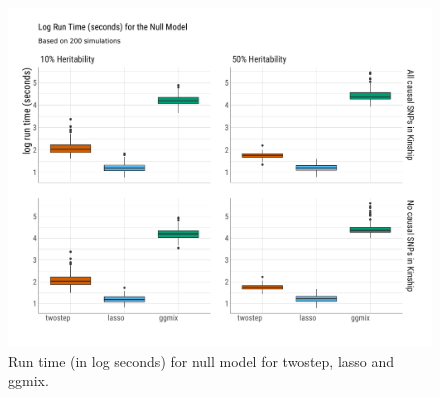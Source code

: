 \documentclass[12pt,letter]{article}\usepackage[]{graphicx}\usepackage[]{color}
\newenvironment{knitrout}{}{} %
\begin{document}
\begin{knitrout}\scriptsize
{}\color{fgcolor}\begin{figure}[H]

{\centering \includegraphics[width=1\linewidth]{figure/plot-runtime-sim-null-model-1} 

}

\caption[Run time (in log seconds) for null model for twostep, lasso and ggmix]{Run time (in log seconds) for null model for twostep, lasso and ggmix.}\label{fig:plot-runtime-sim-null-model}
\end{figure}


\end{knitrout}
\end{document}
